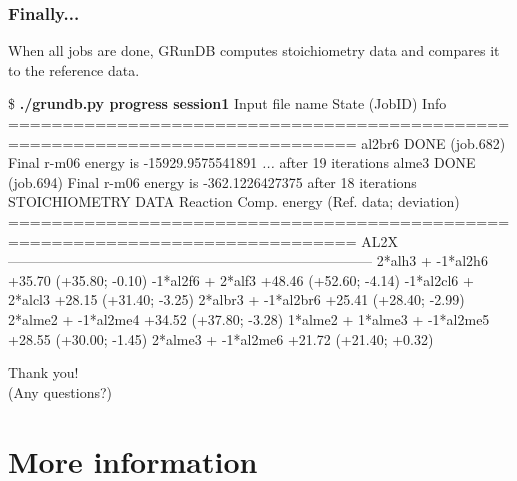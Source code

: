 \documentclass {beamer}
\newcommand{\largeskip}{\vspace{1em}}
\def\+{\largeskip}
\begin{document}
\begin{frame}[fragile]
  \frametitle{Finally...}

  When all jobs are done, GRunDB computes stoichiometry data and
  compares it to the reference data.

  \begin{scriptsize}
\begin{semiverbatim}
\$ {\bf ./grundb.py progress session1}
Input file name  State (JobID)       Info
==============================================================================
al2br6           DONE (job.682)      Final r-m06 energy is -15929.9575541891
  {\em ...}                                                     after 19 iterations 
alme3            DONE (job.694)      Final r-m06 energy is -362.1226427375
                                                           after 18 iterations 
STOICHIOMETRY DATA
Reaction                            Comp. energy  (Ref. data; deviation)
==============================================================================
                                     AL2X
------------------------------------------------------------------------------
2*alh3 + -1*al2h6                         +35.70  (+35.80; -0.10)
-1*al2f6 + 2*alf3                         +48.46  (+52.60; -4.14)
-1*al2cl6 + 2*alcl3                       +28.15  (+31.40; -3.25)
2*albr3 + -1*al2br6                       +25.41  (+28.40; -2.99)
2*alme2 + -1*al2me4                       +34.52  (+37.80; -3.28)
1*alme2 + 1*alme3 + -1*al2me5             +28.55  (+30.00; -1.45)
2*alme3 + -1*al2me6                       +21.72  (+21.40; +0.32)
\end{semiverbatim}    
  \end{scriptsize}
\end{frame}

\begin{frame}
  \begin{center}
    {\Huge Thank you!}
    \\
    \+
    {\Large (Any questions?)}
  \end{center}
\end{frame}

\section{More information}
\end{document}
